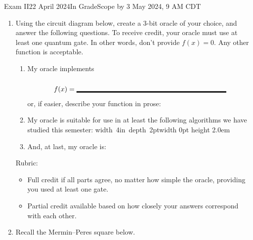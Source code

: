 \documentclass[12pt]{article}
\newcommand{\Blank}[1][1in]{\mbox{\vrule width #1 depth 2pt}\vrule width 0pt height 2.0em}
\begin{document}
\begin{assignment}{Exam II}{22 April 2024}{In GradeScope by 3 May 2024, 9 AM CDT}
\begin{enumerate}
\clearpage\item{}
Using the circuit diagram below, create a 3-bit oracle of your choice, and answer the following questions.  To receive credit, your oracle must use at least one quantum gate.  In other words, don't provide $f(x)=0$. Any other function is acceptable.

\begin{enumerate}
    \item My oracle implements \[f(x)=\Blank[3in]{}\]
    or, if easier, describe your function in prose:
    \LeaveSpace{1.5in}
    \item My oracle is suitable for use in at least the following algorithms we have studied this semester: \Blank[4in]{}
    \item And, at last, my oracle is:
    
    \bigskip
    \begin{center}
\end{center}
\end{enumerate}
Rubric:
\begin{itemize}
    \item Full credit if all parts agree, no matter how simple the oracle, providing you used at least one gate.
    \item Partial credit available based on how closely your answers correspond with each other.
\end{itemize}

\clearpage\item{} Recall the Mermin--Peres square below.


\end{enumerate}
\end{assignment}
\end{document}
